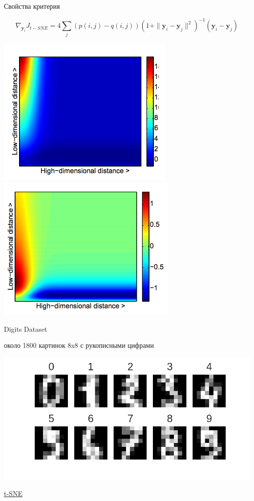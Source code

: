 \documentclass[10pt]{beamer}
\begin{document}
\begin{frame}{Свойства критерия}

\[
\nabla_{\mathbf{y}_i} J_{t-SNE} = 4 \sum_{j} (p(i, j) - q(i, j)) (1 + \| \mathbf{y}_i - \mathbf{y}_j \|^2)^{-1}(\mathbf{y}_i - \mathbf{y}_j) 
\]

\begin{center}
\includegraphics[scale=0.4]{images/grad_sne.png}
\includegraphics[scale=0.4]{images/grad_tsne.png}
\end{center}

\end{frame}

\begin{frame}{Digits Dataset}

около 1800 картинок 8x8 с рукописными цифрами 

\begin{center}
\includegraphics[scale=0.5]{images/digits.png}
\end{center}

\href{https://raw.githubusercontent.com/oreillymedia/t-SNE-tutorial/master/images/animation.gif}{t-SNE}

\end{frame}
\end{document}
